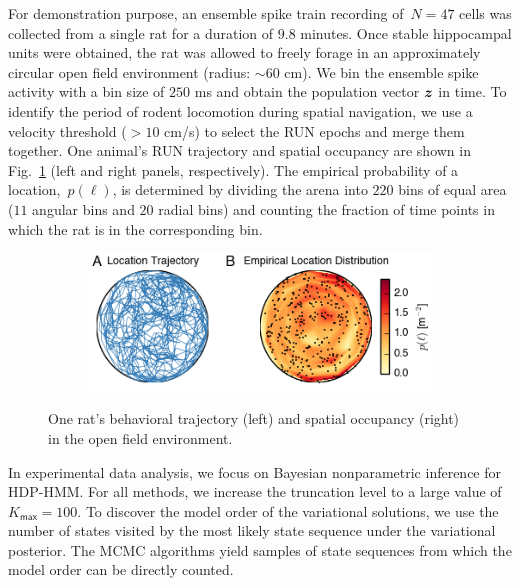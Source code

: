 For demonstration purpose, an ensemble spike train recording
of~${N=47}$ cells was collected from a single rat for a duration of
$9.8$ minutes.  Once stable hippocampal units were obtained, the rat was
allowed to freely forage in an approximately circular open field
environment (radius: $\sim60$ cm).  We bin the ensemble spike activity
with a bin size of $250$ ms and obtain the population vector $\boldsymbol{z}$ in
time.  To identify the period of rodent locomotion during spatial
navigation, we use a velocity threshold ($>10$ cm/s) to select the RUN
epochs and merge them together.  One animal's RUN trajectory and
spatial occupancy are shown in Fig.~\ref{fig4} (left and right panels,
respectively). The empirical probability of a location,~${p(\ell)}$,
is determined by dividing the arena into $220$ bins of equal area ($11$
angular bins and $20$ radial bins) and counting the fraction of time
points in which the rat is in the corresponding bin.

\begin{figure}
\centering
\begin{subfigure}[t]{\textwidth}
\centering
\includegraphics[width=4in]{figures/ch7/Fig4}
\end{subfigure}
\caption[Trajectory of the freely foraging rat during hippocampal
  recording]{One rat's behavioral trajectory (left) and spatial
  occupancy (right) in the open field environment. }
\label{fig4}
\end{figure}

In experimental data analysis, we focus on Bayesian nonparametric
inference for HDP-HMM.  For all methods, we increase the truncation
level to a large value of $K_{\mathsf{max}}=100$.  To discover the model order of the
variational solutions, we use the number of states visited by the most
likely state sequence under the variational posterior. The MCMC
algorithms yield samples of state sequences from which the model order
can be directly counted.


